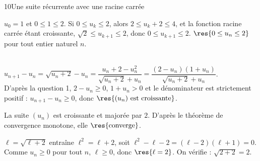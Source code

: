 \begin{corrige}{10}{Une suite récurrente avec une racine carrée}
\begin{questions}
  \item {} $u_0=1$ et $0\leq1\leq2$.\enspace
     Si $0\leq u_k\leq2$, alors $2\leq u_k+2\leq4$, et la fonction racine carrée
    étant croissante, $\sqrt2\leq u_{k+1}\leq2$, donc $0\leq u_{k+1}\leq2$.\enspace
     $\res{0\leq u_n\leq2}$ pour tout entier naturel $n$.
  \item {}\\
    $u_{n+1}-u_n=\sqrt{u_n+2}-u_n=\dfrac{u_n+2-u_n^{2}}{\sqrt{u_n+2}+u_n}=\dfrac{(2-u_n)(1+u_n)}{\sqrt{u_n+2}+u_n}$.\\
    D'après la question 1, $2-u_n\geq0$, $1+u_n>0$ et le dénominateur est strictement positif :
    $u_{n+1}-u_n\geq0$, donc $\res{(u_n)\text{ est croissante}}$.
  \item La suite $(u_n)$ est croissante et majorée par $2$. D'après le théorème de convergence
    monotone, elle $\res{\text{converge}}$.
  \item $\ell=\sqrt{\ell+2}$ entraîne $\ell^{2}=\ell+2$, soit $\ell^{2}-\ell-2=(\ell-2)(\ell+1)=0$.
    Comme $u_n\geq0$ pour tout $n$, $\ell\geq0$, donc $\res{\ell=2}$. On vérifie : $\sqrt{2+2}=2$.
\end{questions}
\end{corrige}

